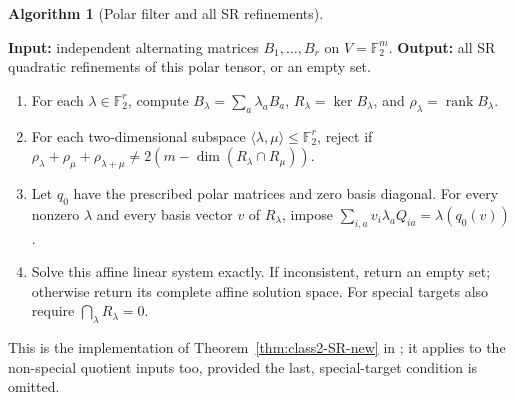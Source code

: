 \documentclass[11pt,a4paper]{amsart}
\theoremstyle{definition}
\newtheorem{algorithm}{Algorithm}
\theoremstyle{remark}
\DeclareMathOperator{\rank}{rank}
\numberwithin{equation}{section}
\begin{document}
\par\noindent\begin{minipage}{\linewidth}
\begin{algorithm}[Polar filter and all SR refinements]\label{alg:class2-filter}
\leavevmode\par
\textbf{Input:} independent alternating matrices $B_1,\ldots,B_r$ on
$V=\mathbb F_2^m$. \textbf{Output:} all SR quadratic refinements of
this polar tensor, or an empty set.
\begin{enumerate}
\item For each $\lambda\in\mathbb F_2^r$, compute
$B_\lambda=\sum_a\lambda_aB_a$, $R_\lambda=\ker B_\lambda$, and
$\rho_\lambda=\rank B_\lambda$.
\item For each two-dimensional subspace
$\langle\lambda,\mu\rangle\le\mathbb F_2^r$, reject if
$\rho_\lambda+\rho_\mu+\rho_{\lambda+\mu}
\ne2(m-\dim(R_\lambda\cap R_\mu))$.
\item Let $q_0$ have the prescribed polar matrices and zero basis
diagonal. For every nonzero $\lambda$ and every basis vector
$v$ of $R_\lambda$, impose
$\sum_{i,a}v_i\lambda_a Q_{ia}=\lambda(q_0(v))$.
\item Solve this affine linear system exactly. If inconsistent, return
an empty set; otherwise return its complete affine solution space.
For special targets also require $\bigcap_\lambda R_\lambda=0$.
\end{enumerate}
\end{algorithm}
\end{minipage}\par\medskip
This is the implementation of Theorem~\ref{thm:class2-SR-new} in
; it applies to the non-special quotient inputs too,
provided the last, special-target condition is omitted.
\end{document}
